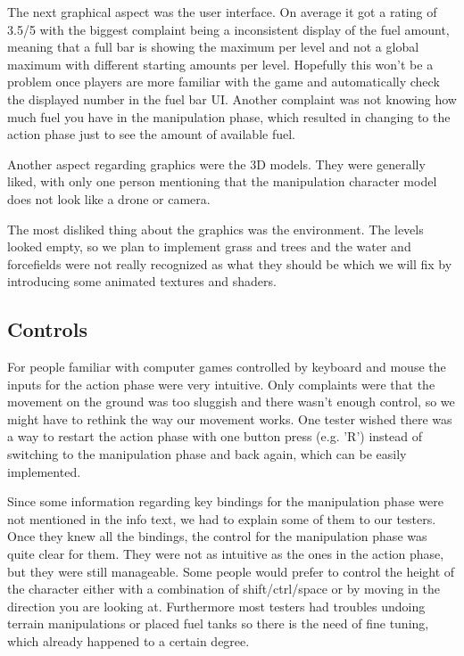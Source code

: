 \documentclass[12pt, letterpaper]{scrartcl}
\begin{document}
	 The next graphical aspect was the user interface. On average it got a rating of 3.5/5 with the biggest complaint being a inconsistent display of the fuel amount, meaning that a full bar is showing the maximum per level and not a global maximum with different starting amounts per level. Hopefully this won't be a problem once players are more familiar with the game and automatically check the displayed number in the fuel bar UI. Another complaint was not knowing how much fuel you have in the manipulation phase, which resulted in changing to the action phase just to see the amount of available fuel.
	 
	 Another aspect regarding graphics were the 3D models. They were generally liked, with only one person mentioning that the manipulation character model does not look like a drone or camera. 
	 
	 The most disliked thing about the graphics was the environment. The levels looked empty, so we plan to implement grass and trees and the water and forcefields were not really recognized as what they should be which we will fix by introducing some animated textures and shaders.
	 
	 \subsection{Controls}
	 For people familiar with computer games controlled by keyboard and mouse the inputs for the action phase were very intuitive. Only complaints were that the movement on the ground was too sluggish and there wasn't enough control, so we might have to rethink the way our movement works. One tester wished there was a way to restart the action phase with one button press (e.g. 'R') instead of switching to the manipulation phase and back again, which can be easily implemented.
	 
	 Since some information regarding key bindings for the manipulation phase were not mentioned in the info text, we had to explain some of them to our testers. Once they knew all the bindings, the control for the manipulation phase was quite clear for them. They were not as intuitive as the ones in the action phase, but they were still manageable. Some people would prefer to control the height of the character either with a combination of shift/ctrl/space or by moving in the direction you are looking at. Furthermore most testers had troubles undoing terrain manipulations or placed fuel tanks so there is the need of fine tuning, which already happened to a certain degree.
	 
\end{document}

